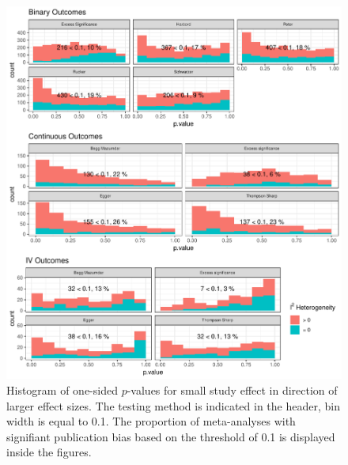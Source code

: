\documentclass[11pt,a4paper,twoside]{book}\usepackage[]{graphicx}\usepackage[]{color}
\newenvironment{knitrout}{}{} %
\begin{document}
\begin{figure}
\begin{knitrout}
\color{fgcolor}

{\centering \includegraphics[width=\textwidth-3cm]{figure/ch03_figunnamed-chunk-11-1} 

}



\end{knitrout}
\caption{Histogram of one-sided $p$-values for small study effect in direction of larger effect sizes. The testing method is indicated in the header, bin width is equal to 0.1. The proportion of meta-analyses with signifiant publication bias based on the threshold of 0.1 is displayed inside the figures.}
\label{fig:test}
\end{figure}
\end{document}
